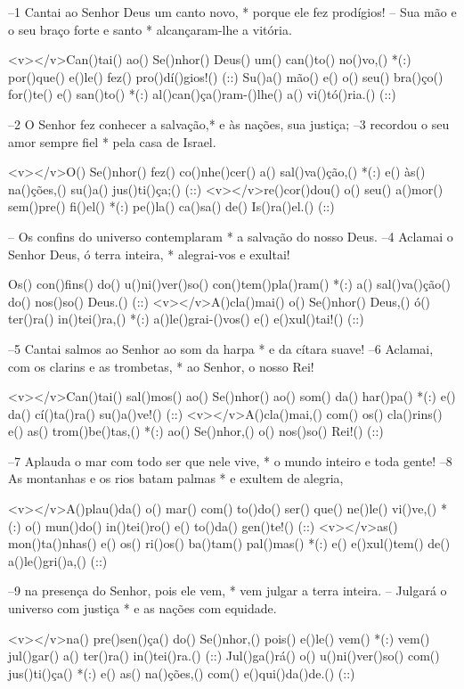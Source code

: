 –1 Cantai ao Senhor Deus um canto novo, *
porque ele fez prodígios!
– Sua mão e o seu braço forte e santo *
alcançaram-lhe a vitória.

<v></v>Can()tai() ao() Se()nhor() Deus() um() can()to() no()vo,() *(:)
por()que() e()le() fez() pro()dí()gios!() (::)
Su()a() mão() e() o() seu() bra()ço() for()te() e() san()to() *(:)
al()can()ça()ram-()lhe() a() vi()tó()ria.() (::)

–2 O Senhor fez conhecer a salvação,*
e às nações, sua justiça;
–3 recordou o seu amor sempre fiel *
pela casa de Israel.

<v></v>O() Se()nhor() fez() co()nhe()cer() a() sal()va()ção,() *(:)
e() às() na()ções,() su()a() jus()ti()ça;() (::)
<v></v>re()cor()dou() o() seu() a()mor() sem()pre() fi()el() *(:)
pe()la() ca()sa() de() Is()ra()el.() (::)

– Os confins do universo contemplaram *
a salvação do nosso Deus.
–4 Aclamai o Senhor Deus, ó terra inteira, *
alegrai-vos e exultai!

Os() con()fins() do() u()ni()ver()so() con()tem()pla()ram() *(:)
a() sal()va()ção() do() nos()so() Deus.() (::)
<v></v>A()cla()mai() o() Se()nhor() Deus,() ó() ter()ra() in()tei()ra,() *(:)
a()le()grai-()vos() e() e()xul()tai!() (::)

–5 Cantai salmos ao Senhor ao som da harpa *
e da cítara suave!
–6 Aclamai, com os clarins e as trombetas, *
ao Senhor, o nosso Rei!

<v></v>Can()tai() sal()mos() ao() Se()nhor() ao() som() da() har()pa() *(:)
e() da() cí()ta()ra() su()a()ve!() (::)
<v></v>A()cla()mai,() com() os() cla()rins() e() as() trom()be()tas,() *(:)
ao() Se()nhor,() o() nos()so() Rei!() (::)

–7 Aplauda o mar com todo ser que nele vive, *
o mundo inteiro e toda gente!
–8 As montanhas e os rios batam palmas *
e exultem de alegria,

<v></v>A()plau()da() o() mar() com() to()do() ser() que() ne()le() vi()ve,() *(:)
o() mun()do() in()tei()ro() e() to()da() gen()te!() (::)
<v></v>as() mon()ta()nhas() e() os() ri()os() ba()tam() pal()mas() *(:)
e() e()xul()tem() de() a()le()gri()a,() (::)

–9 na presença do Senhor, pois ele vem, *
vem julgar a terra inteira.
– Julgará o universo com justiça *
e as nações com equidade.

<v></v>na() pre()sen()ça() do() Se()nhor,() pois() e()le() vem() *(:)
vem() jul()gar() a() ter()ra() in()tei()ra.() (::)
Jul()ga()rá() o() u()ni()ver()so() com() jus()ti()ça() *(:)
e() as() na()ções,() com() e()qui()da()de.() (::)